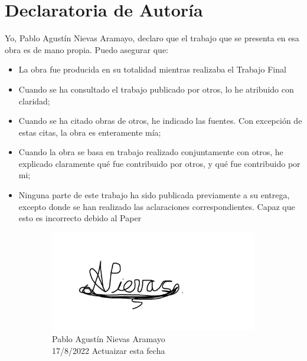 \chapter*{Declaratoria de Autoría}
\thispagestyle{empty}
Yo, Pablo Agustín Nievas Aramayo, declaro que el trabajo que se presenta en esa obra es de mano propia. Puedo asegurar que:

\begin{itemize}
 
\item La obra fue producida en su totalidad mientras realizaba el Trabajo Final

\item Cuando se ha consultado el trabajo publicado por otros, lo he atribuido con claridad;
\item Cuando se ha citado obras de otros, he indicado las fuentes. Con excepción de estas citas, la obra es enteramente mía;
\item Cuando la obra se basa en trabajo realizado conjuntamente con otros, he explicado claramente qué fue contribuido por otros, y qué fue contribuido por mi;
\item Ninguna parte de este trabajo ha sido publicada previamente a su entrega, excepto donde se han realizado las aclaraciones correspondientes. Capaz que esto es incorrecto debido al Paper

\end{itemize}

\vspace{0.5cm}

\begin{figure}[h]
\centering
\begin{subfigure}{0.5\textwidth}
  \centering
  \includegraphics[width=1\linewidth]{imagenes/Firma.png}\\
   Pablo Agustín Nievas Aramayo\\
   17/8/2022 Actuaizar esta fecha
  \label{fig:sub1}
\end{subfigure}%
\label{fig:test}
\end{figure}